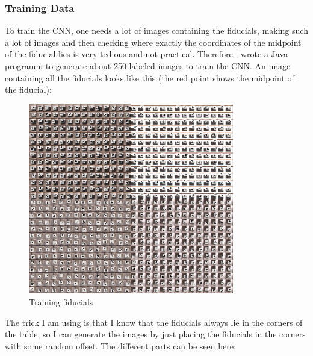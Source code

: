 \subsubsection{Training Data}\label{subsubsec:training-data}
To train the CNN, one needs a lot of images containing the fiducials, making such a lot of images and then checking where exactly the coordinates of the midpoint of the fiducial lies is very tedious and not practical.
Therefore i wrote a Java programm to generate about 250 labeled images to train the CNN.
An image containing all the fiducials looks like this (the red point shows the midpoint of the fiducial):
\begin{figure}[H]
    \centering
    \includegraphics[width=0.8\textwidth]{../photos/training_whole_general_image}
    \caption[fiducials]{Training fiducials}
    \label{fig:fiducials}
\end{figure}
The trick I am using is that I know that the fiducials always lie in the corners of the table, so I can generate the images by just placing the fiducials in the corners with some random offset.
The different parts can be seen here:

